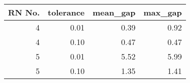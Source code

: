 \begin{tabular}{rrrr}
\toprule
 RN No. &  tolerance & mean_gap & max_gap \\
\midrule
      4 &       0.01 &     0.39 &    0.92 \\
      4 &       0.10 &     0.47 &    0.47 \\
      5 &       0.01 &     5.52 &    5.99 \\
      5 &       0.10 &     1.35 &    1.41 \\
\bottomrule
\end{tabular}
